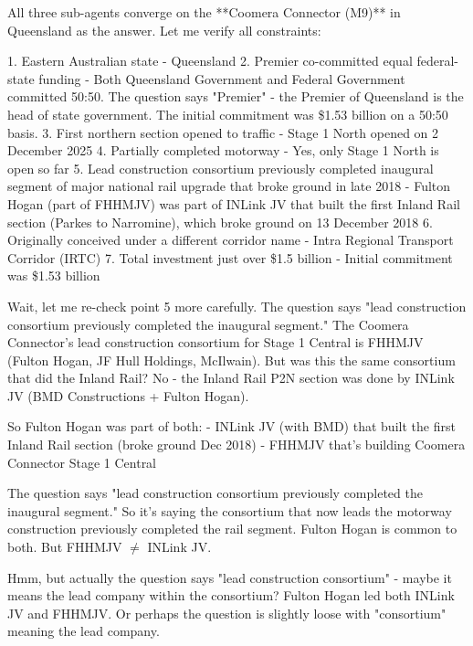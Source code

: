 \documentclass[table]{gtech}
\begin{document}
\begin{tcolorbox}[breakable,enhanced jigsaw,colback=yellow!12,colframe=yellow!55,boxrule=0.4pt,left=5pt,right=5pt,top=3pt,bottom=3pt,fonttitle=\bfseries\sffamily\small,coltitle=black,fontupper=\small,title={Main-agent reasoning (core judgment)}]
All three sub-agents converge on the **Coomera Connector (M9)** in Queensland as the answer. Let me verify all constraints:

1. Eastern Australian state - Queensland
2. Premier co-committed equal federal-state funding - Both Queensland Government and Federal Government committed 50:50. The question says "Premier" - the Premier of Queensland is the head of state government. The initial commitment was \$1.53 billion on a 50:50 basis.
3. First northern section opened to traffic - Stage 1 North opened on 2 December 2025
4. Partially completed motorway - Yes, only Stage 1 North is open so far
5. Lead construction consortium previously completed inaugural segment of major national rail upgrade that broke ground in late 2018 - Fulton Hogan (part of FHHMJV) was part of INLink JV that built the first Inland Rail section (Parkes to Narromine), which broke ground on 13 December 2018
6. Originally conceived under a different corridor name - Intra Regional Transport Corridor (IRTC)
7. Total investment just over \$1.5 billion - Initial commitment was \$1.53 billion

Wait, let me re-check point 5 more carefully. The question says "lead construction consortium previously completed the inaugural segment." The Coomera Connector's lead construction consortium for Stage 1 Central is FHHMJV (Fulton Hogan, JF Hull Holdings, McIlwain). But was this the same consortium that did the Inland Rail? No - the Inland Rail P2N section was done by INLink JV (BMD Constructions + Fulton Hogan).

So Fulton Hogan was part of both:
- INLink JV (with BMD) that built the first Inland Rail section (broke ground Dec 2018)
- FHHMJV that's building Coomera Connector Stage 1 Central

The question says "lead construction consortium previously completed the inaugural segment." So it's saying the consortium that now leads the motorway construction previously completed the rail segment. Fulton Hogan is common to both. But FHHMJV $\neq$ INLink JV.

Hmm, but actually the question says "lead construction consortium" - maybe it means the lead company within the consortium? Fulton Hogan led both INLink JV and FHHMJV. Or perhaps the question is slightly loose with "consortium" meaning the lead company.


\end{tcolorbox}
\end{document}
